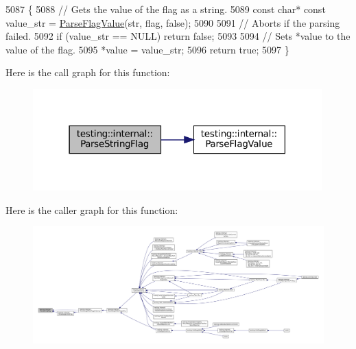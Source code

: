 \begin{DoxyCode}
5087                                                                           \{
5088   \textcolor{comment}{// Gets the value of the flag as a string.}
5089   \textcolor{keyword}{const} \textcolor{keywordtype}{char}* \textcolor{keyword}{const} value\_str = \hyperlink{namespacetesting_1_1internal_a8bfd56af5e4a89bfb76f7e1723e41b03}{ParseFlagValue}(str, flag, \textcolor{keyword}{false});
5090 
5091   \textcolor{comment}{// Aborts if the parsing failed.}
5092   \textcolor{keywordflow}{if} (value\_str == NULL) \textcolor{keywordflow}{return} \textcolor{keyword}{false};
5093 
5094   \textcolor{comment}{// Sets *value to the value of the flag.}
5095   *value = value\_str;
5096   \textcolor{keywordflow}{return} \textcolor{keyword}{true};
5097 \}
\end{DoxyCode}
Here is the call graph for this function\+:
\nopagebreak
\begin{figure}[H]
\begin{center}
\leavevmode
\includegraphics[width=316pt]{namespacetesting_1_1internal_aa4ce312efaaf7a97aac2303173afe021_cgraph}
\end{center}
\end{figure}
Here is the caller graph for this function\+:
\nopagebreak
\begin{figure}[H]
\begin{center}
\leavevmode
\includegraphics[width=350pt]{namespacetesting_1_1internal_aa4ce312efaaf7a97aac2303173afe021_icgraph}
\end{center}
\end{figure}
\mbox{\label{namespacetesting_1_1internal_a60af94307ed4f00a57b5c6d9617c046d}} 
